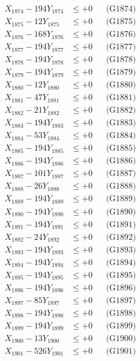 \documentclass[a4paper,10pt]{article}
\begin{document}
{\begin{align}
X_{1874} - 194Y_{1874} &\leq +0 && \text{(G1874)} \\
X_{1875} - 12Y_{1875} &\leq +0 && \text{(G1875)} \\
X_{1876} - 168Y_{1876} &\leq +0 && \text{(G1876)} \\
X_{1877} - 194Y_{1877} &\leq +0 && \text{(G1877)} \\
X_{1878} - 194Y_{1878} &\leq +0 && \text{(G1878)} \\
X_{1879} - 194Y_{1879} &\leq +0 && \text{(G1879)} \\
X_{1880} - 12Y_{1880} &\leq +0 && \text{(G1880)} \\
\allowbreak
X_{1881} - 47Y_{1881} &\leq +0 && \text{(G1881)} \\
X_{1882} - 21Y_{1882} &\leq +0 && \text{(G1882)} \\
X_{1883} - 194Y_{1883} &\leq +0 && \text{(G1883)} \\
X_{1884} - 53Y_{1884} &\leq +0 && \text{(G1884)} \\
X_{1885} - 194Y_{1885} &\leq +0 && \text{(G1885)} \\
X_{1886} - 194Y_{1886} &\leq +0 && \text{(G1886)} \\
X_{1887} - 101Y_{1887} &\leq +0 && \text{(G1887)} \\
X_{1888} - 26Y_{1888} &\leq +0 && \text{(G1888)} \\
X_{1889} - 194Y_{1889} &\leq +0 && \text{(G1889)} \\
X_{1890} - 194Y_{1890} &\leq +0 && \text{(G1890)} \\
\allowbreak
X_{1891} - 194Y_{1891} &\leq +0 && \text{(G1891)} \\
X_{1892} - 24Y_{1892} &\leq +0 && \text{(G1892)} \\
X_{1893} - 194Y_{1893} &\leq +0 && \text{(G1893)} \\
X_{1894} - 194Y_{1894} &\leq +0 && \text{(G1894)} \\
X_{1895} - 194Y_{1895} &\leq +0 && \text{(G1895)} \\
X_{1896} - 194Y_{1896} &\leq +0 && \text{(G1896)} \\
X_{1897} - 85Y_{1897} &\leq +0 && \text{(G1897)} \\
X_{1898} - 194Y_{1898} &\leq +0 && \text{(G1898)} \\
X_{1899} - 194Y_{1899} &\leq +0 && \text{(G1899)} \\
X_{1900} - 13Y_{1900} &\leq +0 && \text{(G1900)} \\
\allowbreak
X_{1901} - 526Y_{1901} &\leq +0 && \text{(G1901)} \\

\end{align}}
\end{document}
